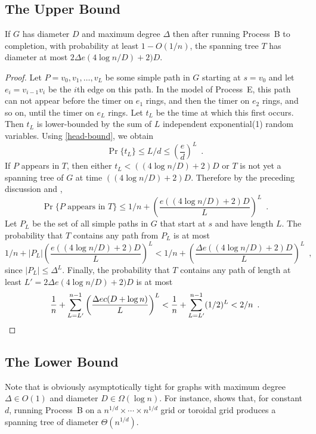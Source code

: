 \documentclass[lotsofwhite]{patmorin}
\begin{document}
\subsection{The Upper Bound}

\begin{thm}
  If $G$ has diameter $D$ and maximum degree $\Delta$ then after running
  Process~B to completion, with probability at least $1-O(1/n)$, the spanning
  tree $T$ has diameter at most $2\Delta e(4\log n/D)+2)D$.
\end{thm}

\begin{proof}
  Let $P=v_0,v_1,\ldots,v_L$ be some simple path in $G$ starting at
  $s=v_0$ and let $e_i=v_{i-1}v_i$ be the $i$th edge on this path.
  In the model of Process~E, this path can not appear before the timer
  on $e_1$ rings, and then the timer on $e_2$ rings, and so on, until the
  timer on $e_L$ rings.  Let $t_L$ be the time at which this first occurs.
  Then $t_L$ is lower-bounded by the sum of $L$ independent exponential(1)
  random variables.  Using \eqref{head-bound}, we obtain
  \[
      \Pr\{t_L\} \le L/d \le \left(\frac{e}{d}\right)^L \enspace .
  \]
  If $P$ appears in $T$, then either $t_L < ((4\log n/D)+2)D$ or $T$ is not
  yet a spanning tree of $G$ at time $((4\log n/D)+2)D$.  
  Therefore by the preceding discussion and , 
  \[
      \Pr\{\text{$P$ appears in $T$}\} \le 1/n 
        + \left(\frac{e((4\log n/D)+2)D}{L}\right)^L \enspace .
  \]
  Let $P_L$ be the set of all simple paths in $G$ that start at $s$ and have length $L$.  The probability that $T$ contains any path from $P_L$ is at most
  \[
      1/n + |P_L|\left(\frac{e((4\log n/D)+2)D}{L}\right)^L 
      < 1/n + \left(\frac{\Delta e((4\log n/D)+2)D}{L}\right)^L \enspace ,
  \]
  since $|P_L|\le \Delta^L$.
  Finally, the probability that $T$ contains any path of length at least
  $L'=2\Delta e(4\log n/D)+2)D$ is at most
  \[
     \frac{1}{n}+\sum_{L=L'}^{n-1} \left(\frac{\Delta ec(D+\log n)}{L}\right)^L <  \frac{1}{n}+\sum_{L=L'}^{n-1} (1/2)^L < 2/n \enspace . \qedhere
  \]
\end{proof}



\subsection{The Lower Bound}

Note that  is obviously asymptotically
tight for graphs with maximum degree $\Delta\in O(1)$ and diameter
$D\in\Omega(\log n)$.  For instance, 
shows that, for constant $d$, running Process~B on a $n^{1/d}\times
\cdots\times n^{1/d}$ grid or toroidal grid produces a
spanning tree of diameter $\Theta(n^{1/d})$.
\end{document}
